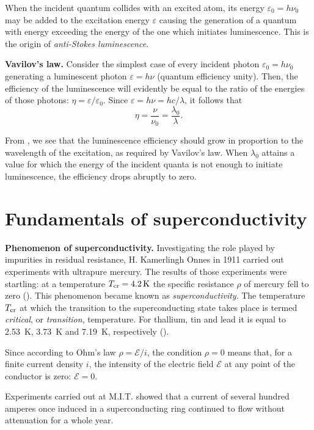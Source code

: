 When the incident quantum collides with an excited atom, its energy $\varepsilon_0=h\nu_0$ may be added to the excitation energy $\varepsilon$ causing the generation of a quantum with energy exceeding the energy of the one which initiates luminescence. This is the origin of \textit{anti-Stokes luminescence}.

\textbf{Vavilov's law.} Consider the simplest case of every incident photon $\varepsilon_0=h\nu_0$ generating a luminescent photon $\varepsilon=h\nu$ (quantum efficiency unity). Then, the efficiency of the luminescence will evidently be equal to the ratio of the energies of those photons: $\eta=\varepsilon/\varepsilon_0$. Since $\varepsilon=h\nu=hc/\lambda$, it follows that
\begin{equation}\label{eq:6_51}
	\eta = \frac{\nu}{\nu_0} = \frac{\lambda_0}{\lambda}.
\end{equation}

From , we see that the luminescence efficiency should grow in proportion to the wavelength of the excitation, as required by Vavilov's law. When $\lambda_0$ attains a value for which the energy of the incident quanta is not enough to initiate luminescence, the efficiency drops abruptly to zero.

\section{Fundamentals of superconductivity}\label{sec:62}

\textbf{Phenomenon of superconductivity.} Investigating the role played by impurities in residual resistance, H. Kamerlingh Onnes in 1911 carried out experiments with ultrapure mercury. The results of those experiments were startling: at a temperature $T_{\text{cr}}=\SI{4.2}{\kelvin}$ the specific resistance $\rho$ of mercury fell to zero (). This phenomenon became known as \textit{superconductivity}. The temperature $T_{\text{cr}}$ at which the transition to the superconducting state takes place is termed \textit{critical}, or \textit{transition}, temperature. For thallium, tin and lead it is equal to \SI{2.53}{\kelvin}, \SI{3.73}{\kelvin} and \SI{7.19}{\kelvin}, respectively ().

Since according to Ohm's law $\rho=\mathcal{E}/i$, the condition $\rho=0$ means that, for a finite current density $i$, the intensity of the electric
field $\mathcal{E}$ at any point of the conductor is zero: $\mathcal{E}=0$.

Experiments carried out at M.I.T. showed that a current of several hundred amperes once induced in a superconducting ring continued to flow without attenuation for a whole year.

